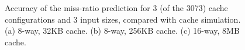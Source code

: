 \begin{figure}[h!]
  \centering
  \caption{Accuracy of the miss-ratio prediction for 3 (of the 3073) cache
    configurations and 3 input sizes, compared with cache simulation.  (a) 8-way, 32KB
    cache.  (b) 8-way, 256KB cache.  (c) 16-way, 8MB cache.}
  \label{fig:parsec_pred}
\end{figure} 

